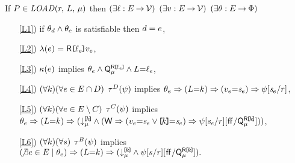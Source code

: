 \noindent
If $\aPS \in \sLOAD[\amode]{\aReg}{\cExp}$ then
$(\exists\ell:E\mathbin\rightarrow\mathcal{V})$
$(\exists v:E\mathbin\rightarrow\mathcal{V})$
$(\exists\theta:E\mathbin\rightarrow\Phi)$
\begin{enumerate}
\item[\ref{L1})] if $\theta_d\land\theta_e$ is satisfiable then $d=e$,
\item[\ref{L2})] $\labelingAct(\aEv) = \DRREF{\cVal_\aEv}{\aVal_\aEv}$,
\item[\ref{L3})] $\kappa(e)$ implies
  \begin{math}
    \theta_e
    \land \smash{\mathsf{Q}_{\mu}^{\mathsf{R}\mkern-2mu\texttt{[}\mkern-2mu\ell_e \mkern-2mu\texttt{]}\mkern-2mu}}
    \land L{=}\ell_e
  \end{math},
\item[\ref{L4})]
  \begin{math}
    (\forall k)
    (\forall e\in E\cap D)
  \end{math}
  $\aTr{\bEvs}{\bForm}$ implies
  \begin{math}
    \cForm_\aEv
    \limplies (\cExp{=}\dVal)
    \limplies (\aVal_\aEv{=}\uReg{\aEv})
    \limplies \bForm[\uReg{\aEv}/\aReg]%
  \end{math},
  \makebox[5.75cm]{}
\item[\ref{L5})] 
  \begin{math}
    (\forall k)
    (\forall e\in E\setminus C)
  \end{math}
  $\aTr{\cEvs}{\bForm}$ implies
  \begin{math}
    \cForm_\aEv
    \limplies (\cExp{=}\dVal)
    \limplies \PBR{        
      \DL{\REF{\dVal}}{\amode} \land
      (\RW
      \limplies (\aVal_\aEv{=}\uReg{\aEv}\lor\REF{\dVal}{=}\uReg{\aEv}) 
      \limplies
      \bForm
      [\uReg{\aEv}/\aReg]%
      [\FALSE/\QL{\REF{\dVal}}{\amode}]
      )
    }      
  \end{math},
\item[\ref{L6})] %
  \begin{math}
    (\forall k)
    (\forall s)
  \end{math}
  $\aTr{\dEvs}{\bForm}$  implies 
  \begin{math}
    (\!\not\exists\aEv\in\aEvs \suchthat \cForm_\aEv)
    \limplies (\cExp{=}\dVal)
    \limplies \PBR{        
      \DL{\REF{\dVal}}{\amode} \land
      \bForm
      [\bReg/\aReg]%
      [\FALSE/\QL{\REF{\dVal}}{\amode}]
    }.
  \end{math}
\end{enumerate}  
